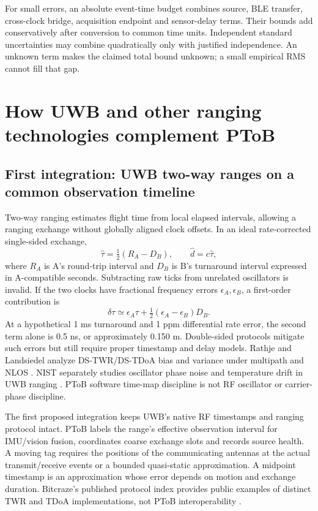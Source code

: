\documentclass[11pt,letterpaper]{article}
\begin{document}
For small errors, an absolute event-time budget combines source, BLE transfer, cross-clock bridge, acquisition endpoint and sensor-delay terms. Their bounds add conservatively after conversion to common time units. Independent standard uncertainties may combine quadratically only with justified independence. An unknown term makes the claimed total bound unknown; a small empirical RMS cannot fill that gap.

\section{How UWB and other ranging technologies complement PToB}\label{sec:ranging}
\subsection{First integration: UWB two-way ranges on a common observation timeline}
Two-way ranging estimates flight time from local elapsed intervals, allowing a ranging exchange without globally aligned clock offsets. In an ideal rate-corrected single-sided exchange,
\begin{equation}
 \hat\tau=\tfrac12(R_A-D_B),\qquad \hat d=c\hat\tau,\label{eq:twr}
\end{equation}
where $R_A$ is A's round-trip interval and $D_B$ is B's turnaround interval expressed in A-compatible seconds. Subtracting raw ticks from unrelated oscillators is invalid. If the two clocks have fractional frequency errors $\epsilon_A,\epsilon_B$, a first-order contribution is
\begin{equation}
 \delta\tau\simeq\epsilon_A\tau+\tfrac12(\epsilon_A-\epsilon_B)D_B.
\end{equation}
At a hypothetical 1 ms turnaround and 1 ppm differential rate error, the second term alone is 0.5 ns, or approximately 0.150 m. Double-sided protocols mitigate such errors but still require proper timestamp and delay models. Rathje and Landsiedel analyze DS-TWR/DS-TDoA bias and variance under multipath and NLOS \cite{rathje}. NIST separately studies oscillator phase noise and temperature drift in UWB ranging \cite{hati}. PToB software time-map discipline is not RF oscillator or carrier-phase discipline.

The first proposed integration keeps UWB's native RF timestamps and ranging protocol intact. PToB labels the range's effective observation interval for IMU/vision fusion, coordinates coarse exchange slots and records source health. A moving tag requires the positions of the communicating antennas at the actual transmit/receive events or a bounded quasi-static approximation. A midpoint timestamp is an approximation whose error depends on motion and exchange duration. Bitcraze's published protocol index provides public examples of distinct TWR and TDoA implementations, not PToB interoperability \cite{bitcraze}.
\end{document}
